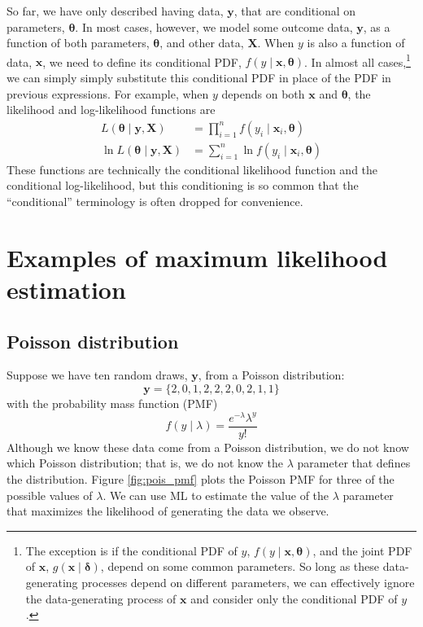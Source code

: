 \documentclass[11pt,letterpaper]{article}
\begin{document}
\noindent So far, we have only described having data, $\bm{y}$, that are conditional on parameters, $\bm{\theta}$. In most cases, however, we model some outcome data, $\bm{y}$, as a function of both parameters, $\bm{\theta}$, and other data, $\bm{X}$. When $y$ is also a function of data, $\bm{x}$, we need to define its conditional PDF, $f(y \mid \bm{x}, \bm{\theta})$. In almost all cases,\footnote{The exception is if the conditional PDF of $y$, $f(y \mid \bm{x}, \bm{\theta})$, and the joint PDF of $\bm{x}$, $g(\bm{x} \mid \bm{\delta})$, depend on some common parameters. So long as these data-generating processes depend on different parameters, we can effectively ignore the data-generating process of $\bm{x}$ and consider only the conditional PDF of $y$.} we can simply simply substitute this conditional PDF in place of the PDF in previous expressions. For example, when $y$ depends on both $\bm{x}$ and $\bm{\theta}$, the likelihood and log-likelihood functions are
\begin{align*}
  L(\bm{\theta} \mid \bm{y}, \bm{X}) & = \prod_{i = 1}^n f(y_i \mid \bm{x}_i, \bm{\theta}) \\
  \ln L(\bm{\theta} \mid \bm{y}, \bm{X}) & = \sum_{i = 1}^n \ln f(y_i \mid \bm{x}_i, \bm{\theta})
\end{align*}
These functions are technically the conditional likelihood function and the conditional log-likelihood, but this conditioning is so common that the ``conditional'' terminology is often dropped for convenience.

\section{Examples of maximum likelihood estimation}

\subsection{Poisson distribution}

Suppose we have ten random draws, $\bm{y}$, from a Poisson distribution:
$$\bm{y} = \{ 2, 0, 1, 2, 2, 2, 0, 2, 1, 1 \}$$
with the probability mass function (PMF)
$$f(y \mid \lambda) = \frac{e^{-\lambda} \lambda^y }{y!}$$
Although we know these data come from a Poisson distribution, we do not know which Poisson distribution; that is, we do not know the $\lambda$ parameter that defines the distribution. Figure \ref{fig:pois_pmf} plots the Poisson PMF for three of the possible values of $\lambda$. We can use ML to estimate the value of the $\lambda$ parameter that maximizes the likelihood of generating the data we observe. \\
\end{document}
